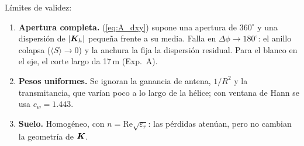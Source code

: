Límites de validez:
\begin{enumerate}[itemsep=1pt]
  \item \textbf{Apertura completa.} (\ref{eq:A_dxy}) supone una apertura de $360^{\circ}$ y una
  dispersión de $|\bm{K}_h|$ pequeña frente a su media. Falla en $\Delta\phi\to180^{\circ}$: el
  anillo colapsa ($\langle S\rangle\to0$) y la anchura la fija la dispersión residual. Para el
  blanco en el eje, el corte largo da 17\,m (Exp.~A).
  \item \textbf{Pesos uniformes.} Se ignoran la ganancia de antena, $1/R^2$ y la transmitancia,
  que varían poco a lo largo de la hélice; con ventana de Hann se usa $c_w=1.443$.
  \item \textbf{Suelo.} Homogéneo, con $n=\mathrm{Re}\sqrt{\varepsilon_r}$: las pérdidas
  atenúan, pero no cambian la geometría de $\bm{K}$.
\end{enumerate}
